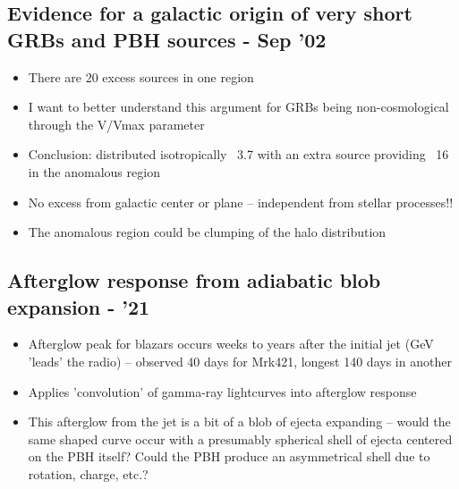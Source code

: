 \documentclass[12pt]{article}
\begin{document}
\subsection{Evidence for a galactic origin of very short GRBs and PBH sources - Sep '02}
\begin{itemize}
    \item There are 20 excess sources in one region 
    \item I want to better understand this argument for GRBs being non-cosmological through the V/Vmax parameter
    \item Conclusion: distributed isotropically ~3.7 with an extra source providing ~16 in the anomalous region
    \item No excess from galactic center or plane -- independent from stellar processes!!
    \item The anomalous region could be clumping of the halo distribution
\end{itemize}

\subsection{Afterglow response from adiabatic blob expansion - '21}
\begin{itemize}
    \item Afterglow peak for blazars occurs weeks to years after the initial jet (GeV 'leads' the radio) -- observed 40 days for Mrk421, longest 140 days in another
    \item Applies 'convolution' of gamma-ray lightcurves into afterglow response
    \item This afterglow from the jet is a bit of a blob of ejecta expanding -- would the same shaped curve occur with a presumably spherical shell of ejecta centered on the PBH itself? Could the PBH produce an asymmetrical shell due to rotation, charge, etc.?
\end{itemize}
\end{document}
